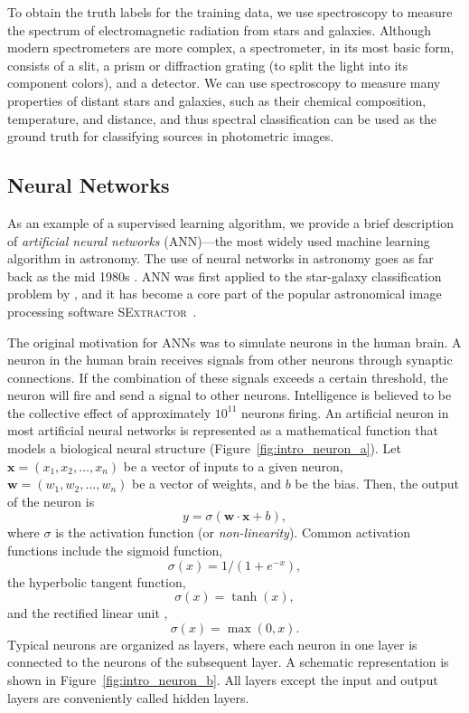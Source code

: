 To obtain the truth labels for the training data,
we use spectroscopy to measure the spectrum of electromagnetic radiation
from stars and galaxies.
Although modern spectrometers are more complex,
a spectrometer, in its most basic form, consists of a slit,
a prism or diffraction grating (to split the light into its component colors), and a detector.
We can use spectroscopy to measure many properties of distant stars and galaxies,
such as their chemical composition, temperature, and distance, and thus
spectral classification can be used as the ground truth for classifying sources in photometric images.

\subsection{Neural Networks}

As an example of a supervised learning algorithm, we provide a brief description of
\textit{artificial neural networks} (ANN)---the most widely used machine learning algorithm in astronomy.
The use of neural networks in astronomy goes as far back as the mid 1980s \citep{jeffrey1986optimization}.
ANN was first applied to the star-galaxy classification problem by \citet{odewahn1992automated},
and it has become a core part of the popular astronomical image processing software \textsc{SExtractor}~\citep{bertin1996sextractor}.

The original motivation for ANNs was to simulate neurons in the human brain.
A neuron in the human brain receives signals from other neurons through synaptic connections.
If the combination of these signals exceeds a certain threshold,
the neuron will fire and send a signal to other neurons.
Intelligence is believed to be the collective effect of
approximately $10^{11}$ neurons firing.
An artificial neuron in most artificial neural networks is represented
as a mathematical function that models a biological neural structure
(Figure~\ref{fig:intro_neuron_a}).
Let $\mathbf{x}=\left(x_1,x_2,\dots,x_n\right)$ be a vector of inputs to a given neuron,
$\mathbf{w}=\left(w_1,w_2,\dots,w_n\right)$ be a vector of weights, and
$b$ be the bias.
Then, the output of the neuron is
\begin{equation}
  y = \sigma \left( \mathbf{w} \cdot \mathbf{x} + b \right),
  \label{eq:intro_neuron_output}
\end{equation}
where $\sigma$ is the activation function (or \textit{non-linearity}).
Common activation functions include the sigmoid function,
\begin{equation}
\sigma(x)=1/\left(1+e^{-x}\right),
\end{equation}
the hyperbolic tangent function,
\begin{equation}
\sigma(x)=\tanh(x),
\end{equation}
and the rectified linear unit \citep[ReLU;][]{nair2010rectified},
\begin{equation}
\sigma(x)=\max(0, x).
\end{equation}
Typical neurons are organized as layers, where each neuron in one layer is connected to the neurons of the subsequent layer.
A schematic representation is shown in Figure~\ref{fig:intro_neuron_b}.
All layers except the input and output layers are conveniently called hidden layers.

